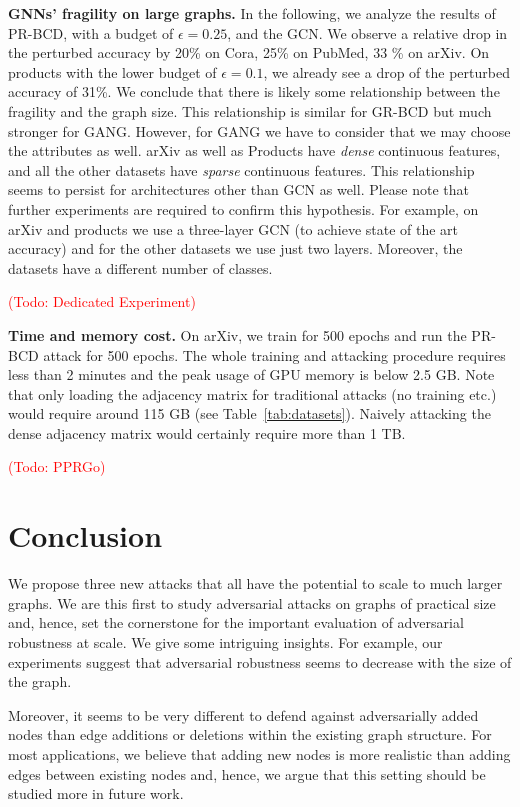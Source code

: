 \documentclass[sigconf,authordraft]{acmart}
\newcommand{\todo}[1]{\textcolor{red}{(Todo: #1)}}
\begin{document}
\textbf{GNNs' fragility on large graphs.} In the following, we analyze the results of PR-BCD, with a budget of \(\epsilon=0.25\), and the GCN. We observe a relative drop in the perturbed accuracy by 20\% on Cora, 25\% on PubMed, 33 \% on arXiv. On products with the lower budget of \(\epsilon=0.1\), we already see a drop of the perturbed accuracy of 31\%. We conclude that there is likely some relationship between the fragility and the graph size. This relationship is similar for GR-BCD but much stronger for GANG. However, for GANG we have to consider that we may choose the attributes as well. arXiv as well as Products have \textit{dense} continuous features, and all the other datasets have \textit{sparse} continuous features. This relationship seems to persist for architectures other than GCN as well. Please note that further experiments are required to confirm this hypothesis. For example, on arXiv and products we use a three-layer GCN (to achieve state of the art accuracy) and for the other datasets we use just two layers. Moreover, the datasets have a different number of classes.

\todo{Dedicated Experiment}

\textbf{Time and memory cost.} On arXiv, we train for 500 epochs and run the PR-BCD attack for 500 epochs. The whole training and attacking procedure requires less than 2 minutes and the peak usage of GPU memory is below 2.5 GB.
Note that only loading the adjacency matrix for traditional attacks (no training etc.) would require around 115 GB (see Table~\ref{tab:datasets}). Naively attacking the dense adjacency matrix would certainly require more than 1 TB.

\todo{PPRGo}

\section{Conclusion}\label{sec:conclusion} %

We propose three new attacks that all have the potential to scale to much larger graphs. We are this first to study adversarial attacks on graphs of practical size and, hence, set the cornerstone for the important evaluation of adversarial robustness at scale. We give some intriguing insights. For example, our experiments suggest that adversarial robustness seems to decrease with the size of the graph.

Moreover, it seems to be very different to defend against adversarially added nodes than edge additions or deletions within the existing graph structure. For most applications, we believe that adding new nodes is more realistic than adding edges between existing nodes and, hence, we argue that this setting should be studied more in future work.
\end{document}
